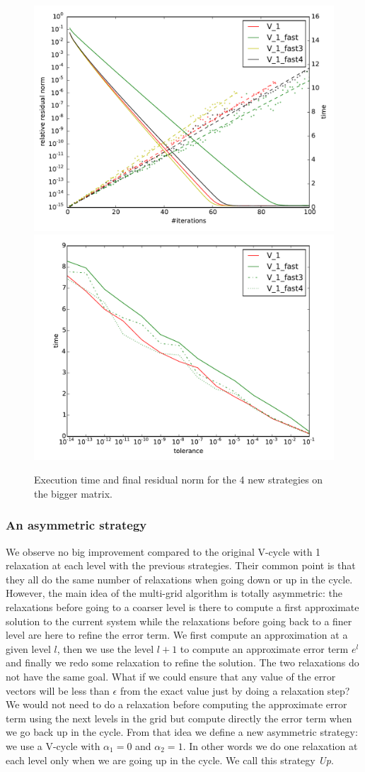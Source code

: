  \begin{figure}
  \includegraphics[width=0.49\linewidth]{figs/convergence_fast.pdf}
   \includegraphics[width=0.49\linewidth]{figs/time_convergence_fast.pdf}
   \caption{Execution time and final residual norm for the 4 new strategies on the bigger matrix.}
   \label{fig.newstrat}
  \end{figure}
  
\subsubsection{An asymmetric strategy}
\label{sec.assymetric}
  We observe no big improvement compared to the original V-cycle with 1 relaxation at each level with the previous strategies.
  Their common point is that they all do the same number of relaxations when going down or up in the cycle. However, the main idea of the multi-grid algorithm is totally asymmetric: the relaxations before
going to a coarser level is there to compute a first approximate solution to the current system while the relaxations before going back to a finer level are here to refine the error term.
  We first compute an approximation at a given level $l$, then we use the level $l+1$ to compute an approximate error term $e^l$ and finally we redo some relaxation to refine the solution. The two relaxations do not have the same goal.
  What if we could ensure that any value of the error vectors will be less than $\epsilon$ from the exact value just by doing a relaxation step? We would not need to do a relaxation
  before computing the approximate error term using the next levels in the grid but compute directly the error term when we go back up in the cycle. From that idea we define a new asymmetric strategy: we use a V-cycle with $\alpha_1 = 0$ and $\alpha_2 = 1$. In other words
  we do one relaxation at each level only when we are going up in the cycle. We call this strategy \emph{Up}.
  
